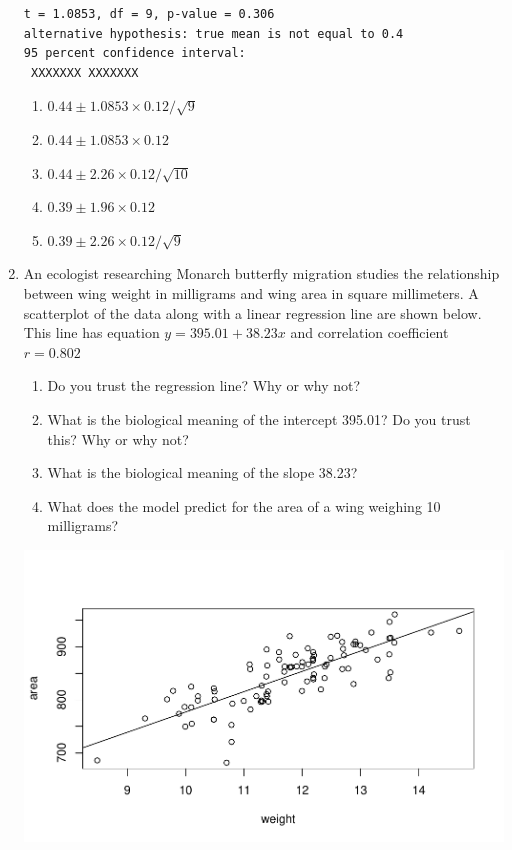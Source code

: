 \documentclass[12pt,fullpage]{amsart}
\begin{document}
\begin{enumerate}
\begin{verbatim}
t = 1.0853, df = 9, p-value = 0.306
alternative hypothesis: true mean is not equal to 0.4
95 percent confidence interval:
 XXXXXXX XXXXXXX
\end{verbatim}
\begin{enumerate}
\item	$0.44 \pm 1.0853 \times 0.12 / \sqrt{9} $
\item	$0.44 \pm 1.0853 \times 0.12  $
\item	$0.44 \pm 2.26 \times 0.12 / \sqrt{10} $
\item	$0.39 \pm 1.96 \times 0.12 $
\item  $0.39 \pm 2.26 \times 0.12 / \sqrt{9} $
\end{enumerate}

\item An ecologist researching Monarch butterfly migration studies the relationship between wing weight in milligrams and wing area in square millimeters. A scatterplot of the data along with a linear regression line are shown below.  This line has equation $y = 395.01 + 38.23 x$ and correlation coefficient $r=0.802$
  \begin{enumerate}
  \item Do you trust the regression line?  Why or why not?

  \item What is the biological meaning of the intercept 395.01?  Do
    you trust this?  Why or why not?

  \item What is the biological meaning of the slope 38.23?

  \item What does the model predict for the area of a wing weighing 10 milligrams?

  \end{enumerate}
\includegraphics[scale=0.7]{areaWeight}



\end{enumerate}
\end{document}
